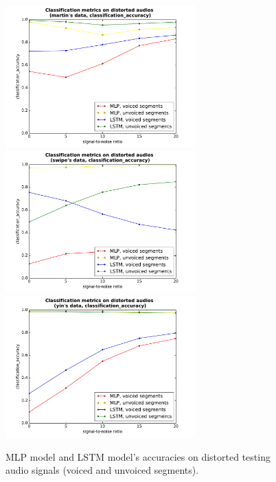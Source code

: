 \documentclass[11pt,a4paper]{report}
\begin{document}
\begin{figure}[htbp]
  \centering
  \includegraphics[width=0.65\textwidth]{classification_metrics_voicedness_martin_classification_accuracy.pdf}
  \includegraphics[width=0.65\textwidth]{classification_metrics_voicedness_swipe_classification_accuracy.pdf}
  \includegraphics[width=0.65\textwidth]{classification_metrics_voicedness_yin_classification_accuracy.pdf}
  \caption{MLP model and LSTM model's accuracies on distorted testing audio signals (voiced and unvoiced segments).}
  \label{fig:distorted-testing-data-accuracy-voicedness}
\end{figure}
\end{document}
